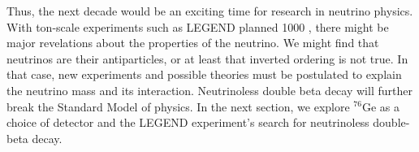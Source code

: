 Thus, the next decade would be an exciting time for research in neutrino physics. With ton-scale experiments such as LEGEND planned 1000 \cite{legend2017}, there might be major revelations about the properties of the neutrino. We might find that neutrinos are their antiparticles, or at least that inverted ordering is not true. In that case, new experiments and possible theories must be postulated to explain the neutrino mass and its interaction. Neutrinoless double beta decay will further break the Standard Model of physics. In the next section, we explore ${}^{76}\mathrm{Ge}$ as a choice of detector and the LEGEND experiment's search for neutrinoless double-beta decay.



